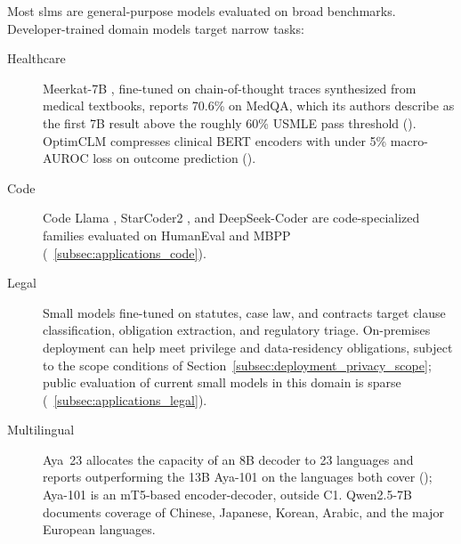 Most \glspl{slm} are general-purpose models evaluated on broad benchmarks. Developer-trained domain models target narrow tasks:

\begin{description}
  \item[Healthcare] Meerkat-7B \citep{kim2025meerkat}, fine-tuned on chain-of-thought traces synthesized from medical textbooks, reports 70.6\% on MedQA, which its authors describe as the first 7B result above the roughly 60\% USMLE pass threshold (\evC). OptimCLM \citep{hasan2024optimclm} compresses clinical BERT encoders with under 5\% macro-AUROC loss on outcome prediction (\evC).
  \item[Code] Code Llama \citep{roziere2023codellama}, StarCoder2 \citep{lozhkov2024starcoder2}, and DeepSeek-Coder \citep{zhu2024deepseek_coder} are code-specialized families evaluated on HumanEval and MBPP (\suppsec~\ref{subsec:applications_code}).
  \item[Legal] Small models fine-tuned on statutes, case law, and contracts target clause classification, obligation extraction, and regulatory triage. On-premises deployment can help meet privilege and data-residency obligations, subject to the scope conditions of Section~\ref{subsec:deployment_privacy_scope}; public evaluation of current small models in this domain is sparse (\suppsec~\ref{subsec:applications_legal}).
  \item[Multilingual] Aya~23 \citep{aryabumi2024aya23} allocates the capacity of an 8B decoder to 23 languages and reports outperforming the 13B Aya-101 \citep{ustun2024aya} on the languages both cover (\evC); Aya-101 is an mT5-based encoder-decoder, outside C1. Qwen2.5-7B \citep{qwen2024qwen25} documents coverage of Chinese, Japanese, Korean, Arabic, and the major European languages.
\end{description}
